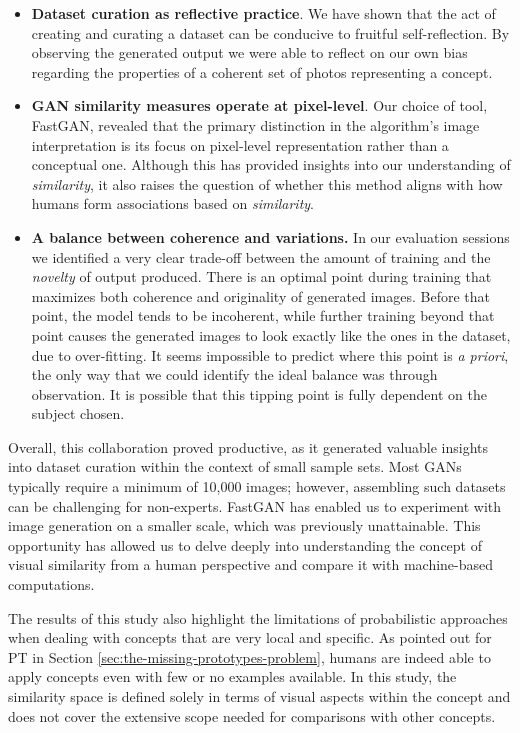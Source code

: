 \begin{itemize}
	\item \textbf{Dataset curation as reflective practice}. We have shown that the act of creating and curating a dataset can be conducive to fruitful self-reflection. By observing the generated output we were able to reflect on our own bias regarding the properties of a coherent set of photos representing a concept.
	\item \textbf{GAN similarity measures operate at pixel-level}. Our choice of tool, FastGAN, revealed that the primary distinction in the algorithm's image interpretation is its focus on pixel-level representation rather than a conceptual one. Although this has provided insights into our understanding of \emph{similarity}, it also raises the question of whether this method aligns with how humans form associations based on \emph{similarity}.
	\item \textbf{A balance between coherence and variations.} In our evaluation sessions we identified a very clear trade-off between the amount of training and the \emph{novelty} of output produced. There is an optimal point during training that maximizes both coherence and originality of generated images. Before that point, the model tends to be incoherent, while further training beyond that point causes the generated images to look exactly like the ones in the dataset, due to over-fitting. It seems impossible to predict where this point is \emph{a priori}, the only way that we could identify the ideal balance was through observation. It is possible that this tipping point is fully dependent on the subject chosen.
\end{itemize}

Overall, this collaboration proved productive, as it generated valuable insights into dataset curation within the context of small sample sets. Most GANs typically require a minimum of 10,000 images; however, assembling such datasets can be challenging for non-experts. FastGAN has enabled us to experiment with image generation on a smaller scale, which was previously unattainable. This opportunity has allowed us to delve deeply into understanding the concept of visual similarity from a human perspective and compare it with machine-based computations.

The results of this study also highlight the limitations of probabilistic approaches when dealing with concepts that are very local and specific. As pointed out for PT in Section \ref{sec:the-missing-prototypes-problem}, humans are indeed able to apply concepts even with few or no examples available. In this study, the similarity space is defined solely in terms of visual aspects within the concept and does not cover the extensive scope needed for comparisons with other concepts.

